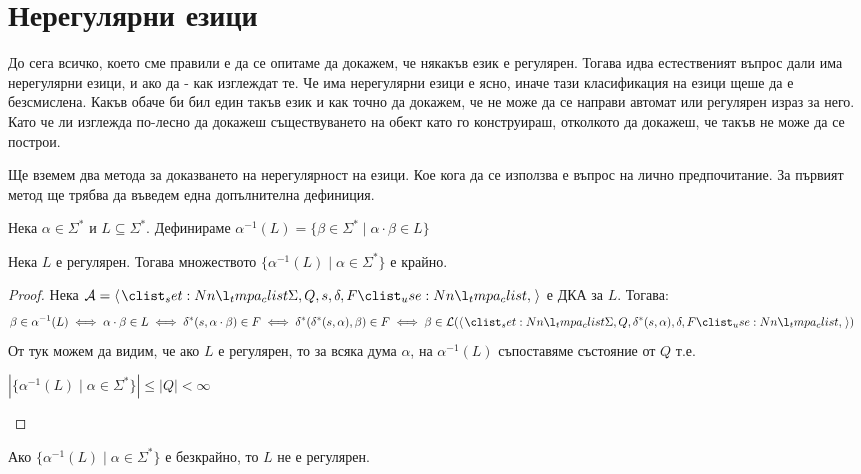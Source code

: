 \section{Нерегулярни езици}

До сега всичко, което сме правили е да се опитаме да докажем, че някакъв език е регулярен.
Тогава идва естественият въпрос дали има нерегулярни езици, и ако да - как изглеждат те.
Че има нерегулярни езици е ясно, иначе тази класификация на езици щеше да е безсмислена.
Какъв обаче би бил един такъв език и как точно да докажем, че не може да се направи автомат или регулярен израз за него.
Като че ли изглежда по-лесно да докажеш съществуването на обект като го конструираш, отколкото да докажеш, че такъв не може да се построи.

Ще вземем два метода за доказването на нерегулярност на езици.
Кое кога да се използва е въпрос на лично предпочитание.
За първият метод ще трябва да въведем една допълнителна дефиниция.

\begin{definition}
    Нека $\alpha \in \Sigma^*$ и $L \subseteq \Sigma^*$. Дефинираме $\alpha^{-1}(L) = \{ \beta \in \Sigma^* \mid \alpha \cdot \beta \in L \}$
\end{definition}

\begin{claim}
    Нека $L$ е регулярен.
    Тогава множеството $\{ \alpha^{-1}(L) \mid \alpha \in \Sigma^* \}$ е крайно.
\end{claim}

\begin{proof}
    Нека $\mathcal{A} = \opair{\Sigma, Q, s, \delta, F}$ е ДКА за $L$. Тогава:
    \begin{align*}
        \beta \in \alpha^{-1}(L) & \iff \alpha \cdot \beta \in L \iff \delta^*(s, \alpha \cdot \beta) \in F \iff \delta^*(\delta^*(s, \alpha), \beta) \in F \iff \beta \in \mathcal{L}(\opair{\Sigma, Q, \delta^*(s, \alpha), \delta, F})
    \end{align*}
    От тук можем да видим, че ако $L$ е регулярен, то за всяка дума $\alpha$,
    на $\alpha^{-1}(L)$ съпоставяме състояние от $Q$ т.е.
    \begin{center}
        $|\{ \alpha^{-1}(L) \mid \alpha \in \Sigma^* \}| \leq |Q| < \infty$
    \end{center}
\end{proof}

\begin{corollary}
    Ако $\{ \alpha^{-1}(L) \mid \alpha \in \Sigma^* \}$ е безкрайно, то $L$ не е регулярен.
\end{corollary}

